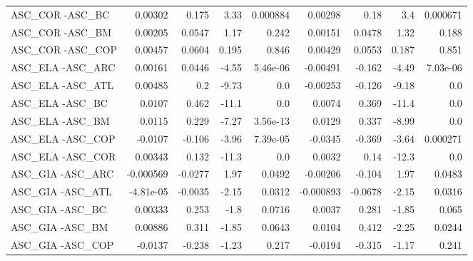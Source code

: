 \begin{tabular}{lrrrrrrrr}
ASC\_COR -ASC\_BC                         &     0.00302 &        0.175 &    3.33 & 0.000884 &    0.00298 &        0.18 &          3.4 &      0.000671 \\
ASC\_COR -ASC\_BM                         &     0.00205 &       0.0547 &    1.17 &    0.242 &    0.00151 &      0.0478 &         1.32 &         0.188 \\
ASC\_COR -ASC\_COP                        &     0.00457 &       0.0604 &   0.195 &    0.846 &    0.00429 &      0.0553 &        0.187 &         0.851 \\
ASC\_ELA -ASC\_ARC                        &     0.00161 &       0.0446 &   -4.55 & 5.46e-06 &   -0.00491 &      -0.162 &        -4.49 &      7.03e-06 \\
ASC\_ELA -ASC\_ATL                        &     0.00485 &          0.2 &   -9.73 &      0.0 &   -0.00253 &      -0.126 &        -9.18 &           0.0 \\
ASC\_ELA -ASC\_BC                         &      0.0107 &        0.462 &   -11.1 &      0.0 &     0.0074 &       0.369 &        -11.4 &           0.0 \\
ASC\_ELA -ASC\_BM                         &      0.0115 &        0.229 &   -7.27 & 3.56e-13 &     0.0129 &       0.337 &        -8.99 &           0.0 \\
ASC\_ELA -ASC\_COP                        &     -0.0107 &       -0.106 &   -3.96 & 7.39e-05 &    -0.0345 &      -0.369 &        -3.64 &      0.000271 \\
ASC\_ELA -ASC\_COR                        &     0.00343 &        0.132 &   -11.3 &      0.0 &     0.0032 &        0.14 &        -12.3 &           0.0 \\
ASC\_GIA -ASC\_ARC                        &   -0.000569 &      -0.0277 &    1.97 &   0.0492 &   -0.00206 &      -0.104 &         1.97 &        0.0483 \\
ASC\_GIA -ASC\_ATL                        &   -4.81e-05 &      -0.0035 &   -2.15 &   0.0312 &  -0.000893 &     -0.0678 &        -2.15 &        0.0316 \\
ASC\_GIA -ASC\_BC                         &     0.00333 &        0.253 &    -1.8 &   0.0716 &     0.0037 &       0.281 &        -1.85 &         0.065 \\
ASC\_GIA -ASC\_BM                         &     0.00886 &        0.311 &   -1.85 &   0.0643 &     0.0104 &       0.412 &        -2.25 &        0.0244 \\
ASC\_GIA -ASC\_COP                        &     -0.0137 &       -0.238 &   -1.23 &    0.217 &    -0.0194 &      -0.315 &        -1.17 &         0.241 \\

\end{tabular}

